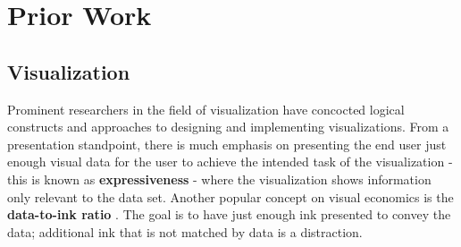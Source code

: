 \documentclass[12pt]{article}
\begin{document}
\vfill

\section{Prior Work}
\subsection{Visualization}
Prominent researchers in the field of visualization have concocted logical constructs and approaches to designing and implementing visualizations. From a presentation standpoint, there is much emphasis on presenting the end user just enough visual data for the user to achieve the intended task of the visualization - this is known as \textbf{expressiveness} \cite{schumann} - where the visualization shows information only relevant to the data set. Another popular concept on visual economics is the \textbf{data-to-ink ratio} \cite{tufte}. The goal is to have just enough ink presented to convey the data; additional ink that is not matched by data is a distraction. 
\end{document}
